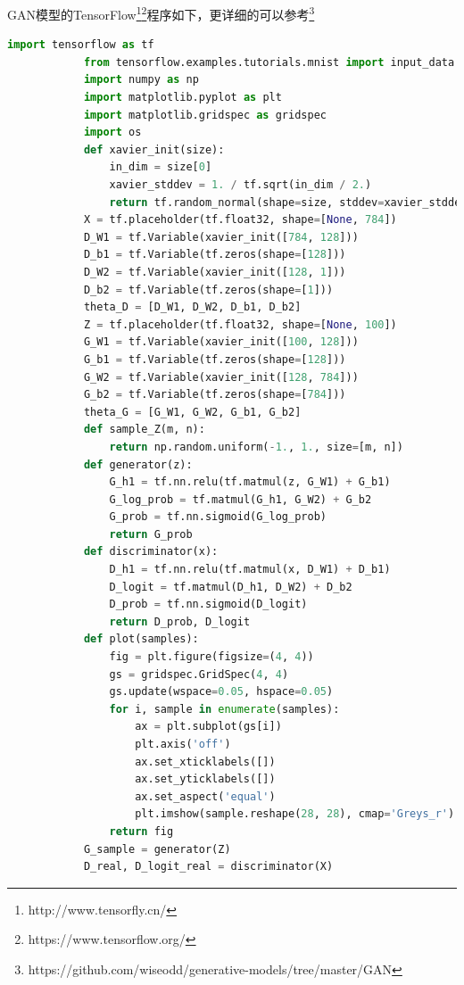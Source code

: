             \par
            GAN模型的TensorFlow\footnote{http://www.tensorfly.cn/}\footnote{https://www.tensorflow.org/}程序如下，更详细的可以参考\footnote{https://github.com/wiseodd/generative-models/tree/master/GAN}
            \begin{lstlisting}[language = Python]
            import tensorflow as tf
            from tensorflow.examples.tutorials.mnist import input_data
            import numpy as np
            import matplotlib.pyplot as plt
            import matplotlib.gridspec as gridspec
            import os
            def xavier_init(size):
                in_dim = size[0]
                xavier_stddev = 1. / tf.sqrt(in_dim / 2.)
                return tf.random_normal(shape=size, stddev=xavier_stddev)
            X = tf.placeholder(tf.float32, shape=[None, 784])
            D_W1 = tf.Variable(xavier_init([784, 128]))
            D_b1 = tf.Variable(tf.zeros(shape=[128]))
            D_W2 = tf.Variable(xavier_init([128, 1]))
            D_b2 = tf.Variable(tf.zeros(shape=[1]))
            theta_D = [D_W1, D_W2, D_b1, D_b2]
            Z = tf.placeholder(tf.float32, shape=[None, 100])
            G_W1 = tf.Variable(xavier_init([100, 128]))
            G_b1 = tf.Variable(tf.zeros(shape=[128]))
            G_W2 = tf.Variable(xavier_init([128, 784]))
            G_b2 = tf.Variable(tf.zeros(shape=[784]))
            theta_G = [G_W1, G_W2, G_b1, G_b2]
            def sample_Z(m, n):
                return np.random.uniform(-1., 1., size=[m, n])
            def generator(z):
                G_h1 = tf.nn.relu(tf.matmul(z, G_W1) + G_b1)
                G_log_prob = tf.matmul(G_h1, G_W2) + G_b2
                G_prob = tf.nn.sigmoid(G_log_prob)
                return G_prob
            def discriminator(x):
                D_h1 = tf.nn.relu(tf.matmul(x, D_W1) + D_b1)
                D_logit = tf.matmul(D_h1, D_W2) + D_b2
                D_prob = tf.nn.sigmoid(D_logit)
                return D_prob, D_logit
            def plot(samples):
                fig = plt.figure(figsize=(4, 4))
                gs = gridspec.GridSpec(4, 4)
                gs.update(wspace=0.05, hspace=0.05)
                for i, sample in enumerate(samples):
                    ax = plt.subplot(gs[i])
                    plt.axis('off')
                    ax.set_xticklabels([])
                    ax.set_yticklabels([])
                    ax.set_aspect('equal')
                    plt.imshow(sample.reshape(28, 28), cmap='Greys_r')
                return fig
            G_sample = generator(Z)
            D_real, D_logit_real = discriminator(X)

\end{lstlisting}

